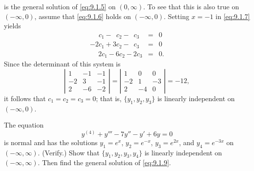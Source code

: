 \begin{examplesolution}
\[\]
is the general solution of \eqref{eq:9.1.5} on $(0,\infty)$. To see that this is also true on
$(-\infty,0)$, assume that \eqref{eq:9.1.6} holds on $(-\infty,0)$. Setting $x=-1$ in
\eqref{eq:9.1.7} yields
\begin{eqnarray*}
  \phantom{-2}c_{1}-\phantom{3}c_{2}-\phantom{2}c_{3} & = & 0 \\
  -2c_{1}+3c_{2}-\phantom{2}c_{3}                     & = & 0 \\
  \phantom{-}2c_{1}-6c_{2}-2c_{3}                     & = & 0.
\end{eqnarray*}
Since the determinant of this system is
\[
  \left|
  \begin{array}{rrr}
    1  & -1 & -1 \\
    -2 & 3  & -1 \\
    2  & -6 & -2
  \end{array}\right|= \left|
  \begin{array}{rrr}
    1  & 0  & 0  \\
    -2 & 1  & -3 \\
    2  & -4 & 0
  \end{array}\right|=-12,
\]
it follows that $c_{1}=c_{2}=c_{3}=0$; that is, $\{y_{1},y_{2},y_{3}\}$ is linearly independent on
$(-\infty,0)$.
\end{examplesolution}

\begin{example}
  \label{example:9.1.2}\rm The equation
  \begin{equation}
    \label{eq:9.1.9}y^{(4)}+y'''-7y''-y'+6y=0
  \end{equation}
  is normal and has the solutions $y_{1}=e^{x}$, $y_{2}=e^{-x}$, $y_{3}=e^{2x}$, and $y_{4}=e^{-3x}$
  on $(-\infty,\infty)$. (Verify.) Show that $\{y_{1},y_{2},y_{3},y_{4}\}$ is linearly independent
  on $(-\infty,\infty)$. Then find the general solution of \eqref{eq:9.1.9}.
\end{example}

